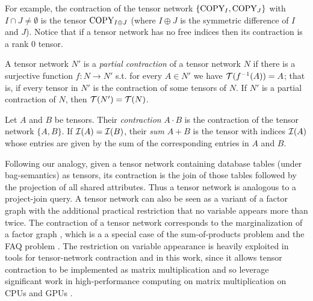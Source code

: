 For example, the contraction of the tensor network $\{\text{COPY}_I, \text{COPY}_J\}$ with $I \cap J \neq \emptyset$ is the tensor $\text{COPY}_{I \oplus J}$ (where $I \oplus J$ is the symmetric difference of $I$ and $J$). Notice that if a tensor network has no free indices then its contraction is a rank 0 tensor. 

A tensor network $N'$ is a \emph{partial contraction} of a tensor network $N$ if there is a surjective function $f: N \rightarrow N'$ s.t. for every $A \in N'$ we have $\mathcal{T}(f^{-1}(A)) = A$; that is, if every tensor in $N'$ is the contraction of some tensors of $N$. If $N'$ is a partial contraction of $N$, then $\mathcal{T}(N') = \mathcal{T}(N)$.

Let $A$ and $B$ be tensors. Their \emph{contraction} $A \cdot B$ is the contraction of the tensor network $\{A, B\}$. If $\mathcal{I}(A) = \mathcal{I}(B)$, their \emph{sum} $A+B$ is the tensor with indices $\mathcal{I}(A)$ whose entries are given by the sum of the corresponding entries in $A$ and $B$.

Following our analogy, given a tensor network containing database tables (under bag-semantics) as tensors, its contraction is the join of those tables followed by the projection of all shared attributes. Thus a tensor network is analogous to a project-join query. A tensor network can also be seen as a variant of a factor graph \cite{KFL01} with the additional practical restriction that no variable appears more than twice. The contraction of a tensor network corresponds to the marginalization of a factor graph \cite{RS17}, which is a a special case of the sum-of-products problem \cite{BDP09,dechter99} and the FAQ problem \cite{KNR16}. The restriction on variable appearance is heavily exploited in tools for tensor-network contraction and in this work, since it allows tensor contraction to be implemented as matrix multiplication and so leverage significant work in high-performance computing on matrix multiplication on CPUs \cite{LHKK77} and GPUs \cite{FSH04}.

